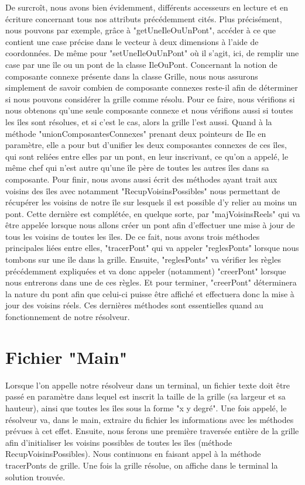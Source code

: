 De surcroît, nous avons bien évidemment, différents accesseurs en lecture et en écriture concernant tous nos attributs précédemment cités. Plus précisément, nous pouvons par exemple, grâce à "getUneIleOuUnPont", accéder à ce que contient une case précise dans le vecteur à deux dimensions à l'aide de coordonnées. De même pour "setUneIleOuUnPont" où il s'agit, ici, de remplir une case par une île ou un pont de la classe IleOuPont.  \newline
Concernant la notion de composante connexe présente dans la classe Grille, nous nous assurons simplement de savoir combien de composante connexes reste-il afin de déterminer si nous pouvons considérer la grille comme résolu. Pour ce faire, nous vérifions si nous obtenons qu'une seule composante connexe et nous vérifions aussi si toutes les îles sont résolues, et si c'est le cas, alors la grille l'est aussi. Quand à la méthode "unionComposantesConnexes" prenant deux pointeurs de Ile en paramètre, elle a pour but d'unifier les deux composantes connexes de ces îles, qui sont reliées entre elles par un pont, en leur inscrivant, ce qu'on a appelé, le même chef qui n'est autre qu'une île père de toutes les autres îles dans sa composante. \newline
Pour finir, nous avons aussi écrit des méthodes ayant trait aux voisins des îles avec notamment "RecupVoisinsPossibles" nous permettant de récupérer les voisins de notre île sur lesquels il est possible d'y relier au moins un pont. Cette dernière est complétée, en quelque sorte, par "majVoisinsReels" qui va être appelée lorsque nous allons créer un pont afin d'effectuer une mise à jour de tous les voisins de toutes les îles. De ce fait, nous avons trois méthodes principales liées entre elles, "tracerPont" qui va appeler "reglesPonts" lorsque nous tombons sur une île dans la grille. Ensuite, "reglesPonts" va vérifier les règles précédemment expliquées et va donc appeler (notamment) "creerPont" lorsque nous entrerons dans une de ces règles. Et pour terminer, "creerPont" déterminera la nature du pont afin que celui-ci puisse être affiché et effectuera donc la mise à jour des voisins réels. Ces dernières méthodes sont essentielles quand au fonctionnement de notre résolveur.





\section{Fichier "Main"}
Lorsque l'on appelle notre résolveur dans un terminal, un fichier texte doit être passé en paramètre dans lequel est inscrit la taille de la grille (sa largeur et sa hauteur), ainsi que toutes les îles sous la forme "x y degré". Une fois appelé, le résolveur va, dans le main, extraire du fichier les informations avec les méthodes prévues à cet effet. Ensuite, nous ferons une première traversée entière de la grille afin d'initialiser les voisins possibles de toutes les îles (méthode RecupVoisinsPossibles). Nous continuons en faisant appel à la méthode tracerPonts de grille. Une fois la grille résolue, on affiche dans le terminal la solution trouvée. \newline

